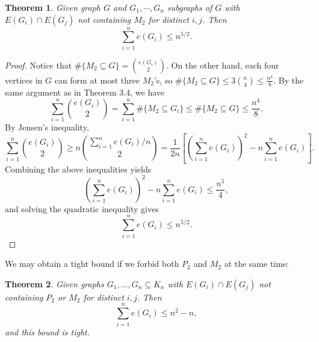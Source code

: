 \documentclass[12pt]{report}
\newtheorem{theorem}{Theorem}[chapter]
\begin{document}
\begin{theorem}
  Given graph $G$ and $G_1, \cdots, G_n$ subgraphs of $G$ with $E(G_i) \cap E(G_j)$ not containing
  $M_2$ for distinct $i, j$. Then
  \[
    \sum_{i = 1}^n e(G_i) \leq n^{5/2}.
  \]
\end{theorem}

\begin{proof}
  Notice that $\#\{M_2 \subseteq G\} = \binom{e(G_i)}{2}$. On the other hand, each four vertices in
  $G$ can form at most three $M_2$'s, so $\#\{M_2 \subseteq G\} \leq 3\binom{n}{4} \leq
  \frac{n^4}{8}$. By the same argument as in Theorem 3.4, we have 
  \[
    \sum_{i = 1}^n \binom{e(G_i)}{2} = \sum_{i = 1}^n \#\{M_2 \subseteq G_i\} \leq \#\{M_2 \subseteq G\} \leq \frac{n^4}{8}.
  \]
  By Jensen's inequality,
  \[
    \sum_{i = 1}^n \binom{e(G_i)}{2} \geq n\binom{\sum_{i = 1}^n e(G_i)/n}{2} = \frac{1}{2n}\left[\left(\sum_{i = 1}^n e(G_i)\right)^2 - n\sum_{i = 1}^n e(G_i)\right].
  \]
  Combining the above inequalities yields
  \[
    \left(\sum_{i = 1}^n e(G_i)\right)^2 - n\sum_{i = 1}^n e(G_i) \leq \frac{n^5}{4},
  \]
  and solving the quadratic inequality gives
  \[
    \sum_{i = 1}^n e(G_i) \leq n^{5/2}.
  \]
\end{proof}

We may obtain a tight bound if we forbid both $P_2$ and $M_2$ at the same time:

\begin{theorem}
  Given graphs $G_1, \ldots, G_n \subseteq K_n$ with $E(G_i) \cap E(G_j)$ not containing $P_2$ or
  $M_2$ for distinct $i, j$. Then
  \[
    \sum_{i = 1}^n e(G_i) \leq n^2 - n,
  \]
  and this bound is tight.
\end{theorem}
\end{document}
